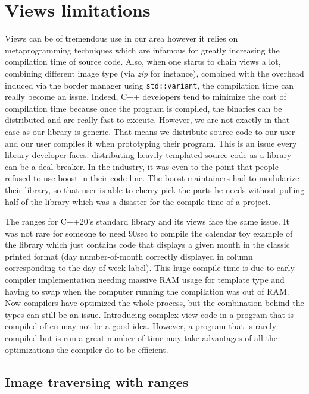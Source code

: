 \section{Views limitations}

Views can be of tremendous use in our area however it relies on metaprogramming techniques which are infamous for
greatly increasing the compilation time of source code. Also, when one starts to chain views a lot, combining different
image type (via \emph{zip} for instance), combined with the overhead induced via the border manager using
\texttt{std::variant}, the compilation time can really become an issue. Indeed, C++ developers tend to minimize the cost
of compilation time because once the program is compiled, the binaries can be distributed and are really fast to
execute. However, we are not exactly in that case as our library is generic. That means we distribute source code to our
user and our user compiles it when prototyping their program. This is an issue every library developer faces:
distributing heavily templated source code as a library can be a deal-breaker. In the industry, it was even to the point
that people refused to use boost in their code line. The boost maintainers had to modularize their library, so that user
is able to cherry-pick the parts he needs without pulling half of the library which was a disaster for the compile time
of a project.

The ranges for C++20's standard library and its views face the same issue. It was not rare for someone to need 90sec to
compile the calendar toy example of the library which just contains code that displays a given month in the classic
printed format (day number-of-month correctly displayed in column corresponding to the day of week label). This huge
compile time is due to early compiler implementation needing massive RAM usage for template type and having to swap when
the computer running the compilation was out of RAM. Now compilers have optimized the whole process, but the combination
behind the types can still be an issue. Introducing complex view code in a program that is compiled often may not be a
good idea. However, a program that is rarely compiled but is run a great number of time may take advantages of all the
optimizations the compiler do to be efficient.

\subsection{Image traversing with ranges}
\label{subsec.range.traversing}

